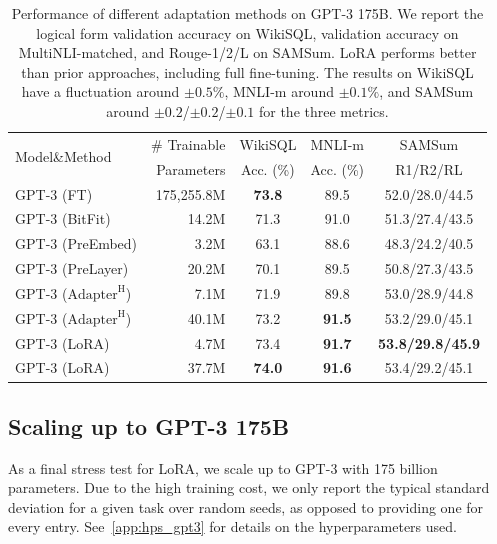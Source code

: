  












\begin{table}[h]
  \centering
  \begin{tabular}{l|r|ccc}
  \hline
  \toprule
  \multirow{2}{*}{Model\&Method}  & \# Trainable &  WikiSQL & MNLI-m & SAMSum  \\ %
  \cline{3-5}
  & Parameters & Acc. (\%) & Acc. (\%) & R1/R2/RL \\
  \midrule
  GPT-3 (FT)                         & 175,255.8M &  \textbf{73.8}  &  89.5 & 52.0/28.0/44.5 \\
  GPT-3 (BitFit)                  & 14.2M & 71.3 & 91.0 & 51.3/27.4/43.5 \\
  GPT-3 (PreEmbed)                   & 3.2M  & 63.1 & 88.6 & 48.3/24.2/40.5 \\
  GPT-3 (PreLayer)                   & 20.2M & 70.1 & 89.5 & 50.8/27.3/43.5 \\
  GPT-3 ($\text{Adapter}^{\text{H}}$)& 7.1M  & 71.9 & 89.8 & 53.0/28.9/44.8  \\
  GPT-3 ($\text{Adapter}^{\text{H}}$)& 40.1M & 73.2 & \textbf{91.5} & 53.2/29.0/45.1  \\
  \midrule
  GPT-3 (LoRA)                       & 4.7M & 73.4 & \textbf{91.7} & \textbf{53.8/29.8/45.9} \\ 
  GPT-3 (LoRA)                       & 37.7M & \textbf{74.0} & \textbf{91.6} & 53.4/29.2/45.1 \\ 
  \bottomrule
  \end{tabular}
  \caption{Performance of different adaptation methods on GPT-3 175B. We report the logical form validation accuracy on WikiSQL, validation accuracy on MultiNLI-matched, and Rouge-1/2/L on SAMSum. LoRA performs better than prior approaches, including full fine-tuning. The results on WikiSQL have a fluctuation around $\pm0.5\%$, MNLI-m around $\pm0.1\%$, and SAMSum around $\pm0.2$/$\pm0.2$/$\pm0.1$ for the three metrics.}
  \label{tab:gpt3_ft_results}
\end{table}



\subsection{Scaling up to GPT-3 175B}
\label{sec:gpt3_expts}
As a final stress test for LoRA, we scale up to GPT-3 with 175 billion parameters.
Due to the high training cost, we only report the typical standard deviation for a given task over random seeds, as opposed to providing one for every entry.
See~\autoref{app:hps_gpt3} for details on the hyperparameters used.


